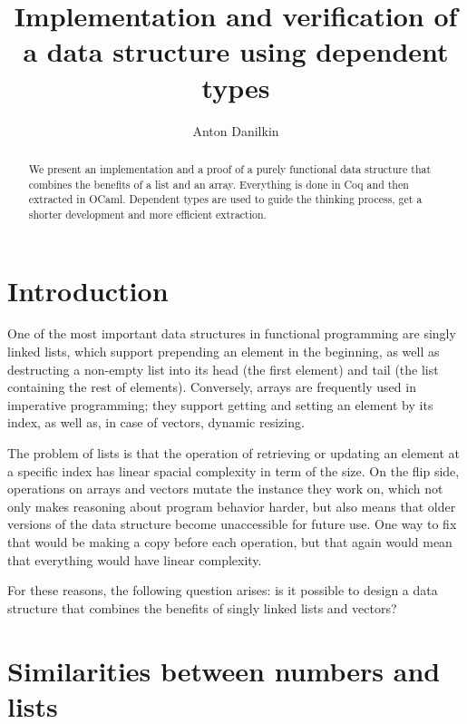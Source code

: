 \documentclass{article}
\title{Implementation and verification of a data structure using dependent types}
\author{Anton Danilkin}
\newenvironment{no_space_center}
    {\parskip=0pt\par\nopagebreak\centering}
    {\par\noindent\ignorespacesafterend}
\begin{document}
\begin{no_space_center}
    \begin{minipage}{10cm}
        \maketitle

        \begin{abstract}
            We present an implementation and a proof of a purely functional data structure that combines the benefits of a list and an array. Everything is done in Coq and then extracted in OCaml. Dependent types are used to guide the thinking process, get a shorter development and more efficient extraction.
        \end{abstract}
    \end{minipage}
\end{no_space_center}

\vspace{2cm}

\section{Introduction}

One of the most important data structures in functional programming are singly linked lists, which support prepending an element in the beginning, as well as destructing a non-empty list into its head (the first element) and tail (the list containing the rest of elements). Conversely, arrays are frequently used in imperative programming; they support getting and setting an element by its index, as well as, in case of vectors, dynamic resizing.

The problem of lists is that the operation of retrieving or updating an element at a specific index has linear spacial complexity in term of the size. On the flip side, operations on arrays and vectors mutate the instance they work on, which not only makes reasoning about program behavior harder, but also means that older versions of the data structure become unaccessible for future use. One way to fix that would be making a copy before each operation, but that again would mean that everything would have linear complexity.

For these reasons, the following question arises: is it possible to design a data structure that combines the benefits of singly linked lists and vectors?

\section{Similarities between numbers and lists}
\end{document}
